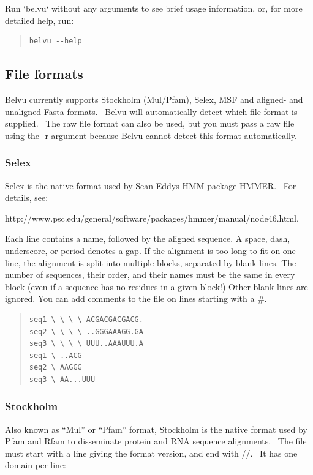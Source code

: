 \documentclass[letterpaper]{article}
\begin{document}
Run {\textquoteleft}belvu{\textquoteleft} without any arguments to see brief usage information, or, for more detailed help, run:
\begin{quote}
\begin{verbatim}
belvu --help 
\end{verbatim}
\end{quote}

\subsection[File formats]{File formats}
Belvu currently supports Stockholm (Mul/Pfam), Selex, MSF and aligned- and unaligned Fasta formats. \ Belvu will automatically detect which file format is supplied. \ The {\textquotesingle}raw{\textquotesingle} file format can also be used, but you must pass a raw file using the {\textasciigrave}-r{\textasciigrave} argument because Belvu cannot detect this format automatically.

\subsubsection[Selex]{Selex}
Selex is the native format used by Sean Eddy{\textquotesingle}s HMM package HMMER. \ For details, see:

http://www.psc.edu/general/software/packages/hmmer/manual/node46.html.

\bigskip

Each line contains a name, followed by the aligned sequence. A space, dash, underscore, or period denotes a gap. If the alignment is too long to fit on one line, the alignment is split into multiple blocks, separated by blank lines. The number of sequences, their order, and their names must be the same in every block (even if a sequence has no residues in a given block!) Other blank lines are ignored. You can add comments to the file on lines starting with a \#.

\begin{quote}
\begin{verbatim}
seq1 \ \ \ \ ACGACGACGACG.
seq2 \ \ \ \ ..GGGAAAGG.GA
seq3 \ \ \ \ UUU..AAAUUU.A
seq1 \ ..ACG
seq2 \ AAGGG
seq3 \ AA...UUU
\end{verbatim}
\end{quote}

\subsubsection[Stockholm]{Stockholm}
Also known as {\textquotedblleft}Mul{\textquotedblright} or {\textquotedblleft}Pfam{\textquotedblright} format, Stockholm is the native format used by Pfam and Rfam to disseminate protein and RNA sequence alignments. \ The file must start with a line giving the format version, and end with {\textasciigrave}//{\textasciigrave}. \ It has one domain per line:
\end{document}
